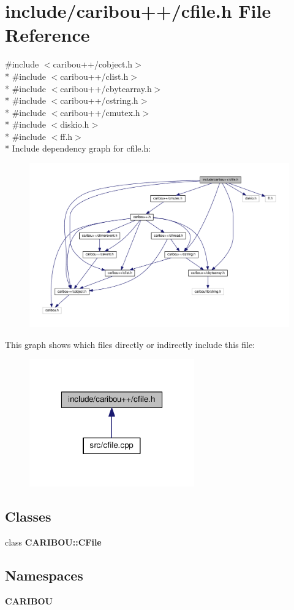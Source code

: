\section{include/caribou++/cfile.h File Reference}
\label{cfile_8h}
{\ttfamily \#include $<$caribou++/cobject.\-h$>$}\\*
{\ttfamily \#include $<$caribou++/clist.\-h$>$}\\*
{\ttfamily \#include $<$caribou++/cbytearray.\-h$>$}\\*
{\ttfamily \#include $<$caribou++/cstring.\-h$>$}\\*
{\ttfamily \#include $<$caribou++/cmutex.\-h$>$}\\*
{\ttfamily \#include $<$diskio.\-h$>$}\\*
{\ttfamily \#include $<$ff.\-h$>$}\\*
Include dependency graph for cfile.\-h\-:\nopagebreak
\begin{figure}[H]
\begin{center}
\leavevmode
\includegraphics[width=350pt]{cfile_8h__incl}
\end{center}
\end{figure}
This graph shows which files directly or indirectly include this file\-:\nopagebreak
\begin{figure}[H]
\begin{center}
\leavevmode
\includegraphics[width=202pt]{cfile_8h__dep__incl}
\end{center}
\end{figure}
\subsection*{Classes}
\begin{DoxyCompactItemize}
\item 
class {\bf C\-A\-R\-I\-B\-O\-U\-::\-C\-File}
\end{DoxyCompactItemize}
\subsection*{Namespaces}
\begin{DoxyCompactItemize}
\item 
{\bf C\-A\-R\-I\-B\-O\-U}
\end{DoxyCompactItemize}
